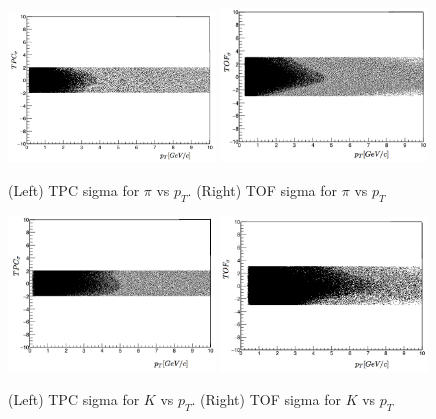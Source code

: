 \begin{figure}[ht]
\includegraphics[width=0.49\textwidth]{Images/Chapter4/tpcsigmapi.png}
\includegraphics[width=0.49\textwidth]{Images/Chapter4/tofsigmapi.png}
\caption{(Left) TPC sigma for $\pi$ vs $p_{T}$. (Right) TOF sigma for $\pi$ vs $p_{T}$}
\label{Fig:chap4-4.3a}
\end{figure}


\begin{figure}[ht]
\includegraphics[width=0.49\textwidth]{Images/Chapter4/tpcsigmak.png}
\includegraphics[width=0.49\textwidth]{Images/Chapter4/tofsigmak.png}
\caption{(Left) TPC sigma for $K$ vs $p_{T}$. (Right) TOF sigma for $K$ vs $p_{T}$}
\label{Fig:chap4-4.3b}
\end{figure}

